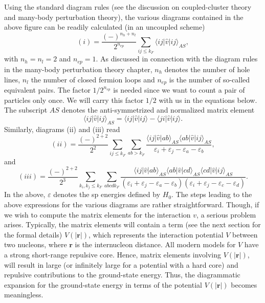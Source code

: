 Using the standard diagram rules (see the discussion on
coupled-cluster theory and many-body perturbation theory), the various
diagrams contained in the above figure can be readily calculated (in
an uncoupled scheme)
\begin{equation}
   (i)=\frac{(-)^{n_h+n_l}}{2^{n_{ep}}}\sum_{ij\leq k_F}
       \langle ij\vert\hat{v}\vert ij\rangle_{AS},
\end{equation}
with $n_h=n_l=2$ and $n_{ep}=1$. As discussed in connection with the
diagram rules in the many-body perturbation theory chapter, $n_h$
denotes the number of hole lines, $n_l$ the number of closed fermion
loops and $n_{ep}$ is the number of so-called equivalent pairs.  The
factor $1/2^{n_{ep}}$ is needed since we want to count a pair of
particles only once. We will carry this factor $1/2$ with us in the
equations below.  The subscript $AS$ denotes the anti-symmetrized and
normalized matrix element
\begin{equation}
     \langle ij\vert\hat{v}\vert ij\rangle_{AS}=\langle ij \vert\hat{v}\vert ij\rangle-
     \langle ji \vert\hat{v}\vert ij\rangle.
\end{equation}
Similarly, diagrams (ii) and (iii) read
\begin{equation}
   (ii)=\frac{(-)^{2+2}}{2^2}\sum_{ij\leq k_F}\sum_{ab>k_F}
   \frac{\langle ij\vert\hat{v}\vert ab\rangle_{AS}
   \langle ab\vert\hat{v}\vert ij\rangle_{AS}}
   {\varepsilon_i+\varepsilon_j-\varepsilon_a-\varepsilon_b},
\end{equation}
and
\begin{equation}
   (iii)=\frac{(-)^{2+2}}{2^3}\sum_{k_i,k_j\leq k_F}\sum_{abcdk_F}
   \frac{\langle ij\vert\hat{v}\vert ab\rangle_{AS}
   \langle ab\vert\hat{v}\vert cd\rangle_{AS}
   \langle cd\vert\hat{v}\vert ij\rangle_{AS}}
   {(\varepsilon_i+\varepsilon_j-\varepsilon_a-\varepsilon_b)
   (\varepsilon_i+\varepsilon_j-\varepsilon_c-\varepsilon_d)}.
\end{equation}
In the above, $\varepsilon$ denotes the sp energies defined by
$H_0$.
The steps leading to the above expressions for the various
diagrams are rather straightforward. Though, if we wish to compute the
matrix elements for the interaction $v$, a serious problem
arises. Typically, the matrix elements will contain a term
(see the next section for the formal details) $V(|{\mathbf r}|)$, which
represents the interaction potential $V$ between two nucleons, where
${\mathbf r}$ is the internucleon distance.
All modern models
for $V$ have a strong short-range repulsive core. Hence,
matrix elements involving $V(|{\mathbf r}|)$, will result in large
(or infinitely large for a potential with a hard core)
and repulsive contributions to the ground-state energy. Thus, the
diagrammatic expansion for the ground-state energy in terms of the
potential $V(|{\mathbf r}|)$ becomes meaningless.

